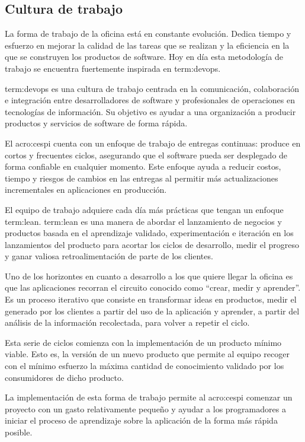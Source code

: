 \subsection{Cultura de trabajo}
\label{cultura_de_trabajo}

La forma de trabajo de la oficina está en constante evolución. Dedica tiempo y
esfuerzo en mejorar la calidad de las tareas que se realizan y la eficiencia en
la que se construyen los productos de software. Hoy en día esta metodología de
trabajo se encuentra fuertemente inspirada en \gls{term:devops}.

\gls{term:devops} es una cultura de trabajo centrada en la comunicación,
colaboración e integración entre desarrolladores de software y profesionales de
operaciones en tecnologías de información. Su objetivo es ayudar a una
organización a producir productos y servicios de software de forma rápida.

El \gls{acro:cespi} cuenta con un enfoque de trabajo de entregas continuas: produce
en cortos y frecuentes ciclos, asegurando que el software pueda ser desplegado
de forma confiable en cualquier momento. Este enfoque ayuda a reducir costos,
tiempo y riesgos de cambios en las entregas al permitir más actualizaciones
incrementales en aplicaciones en producción.

El equipo de trabajo adquiere cada día más prácticas que tengan un enfoque
\gls{term:lean}. \gls{term:lean} es una manera de abordar el lanzamiento de
negocios y productos basada en el aprendizaje validado, experimentación e
iteración en los lanzamientos del producto para acortar los ciclos de
desarrollo, medir el progreso y ganar valiosa retroalimentación de parte de los
clientes.

Uno de los horizontes en cuanto a desarrollo a los que quiere llegar la oficina
es que las aplicaciones recorran el circuito  conocido como
“crear, medir y aprender”. Es un proceso iterativo que consiste en transformar
ideas en productos, medir el  generado por los clientes a partir
del uso de la aplicación y aprender, a partir del análisis de la información
recolectada, para volver a repetir el ciclo.

Esta serie de ciclos comienza con la implementación de un producto mínimo
viable. Esto es, la versión de un nuevo producto que permite al equipo recoger
con el mínimo esfuerzo la máxima cantidad de conocimiento validado por los
consumidores de dicho producto.

La implementación de esta forma de trabajo permite al \gls{acro:cespi} comenzar un
proyecto con un gasto relativamente pequeño y ayudar a los programadores a
iniciar el proceso de aprendizaje sobre la aplicación de la forma más rápida
posible\cite[p~.2]{lean:the_lean_startup}.

